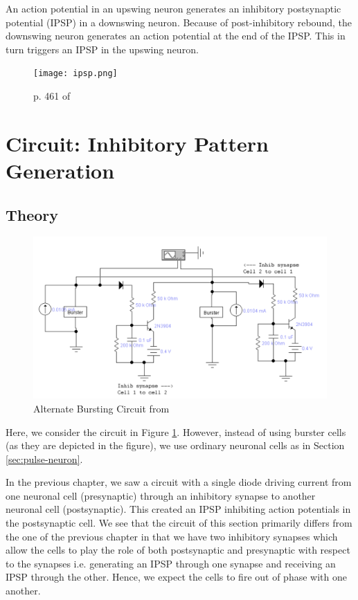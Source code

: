 \documentclass[12]{book}
\newcommand\0{\mathbf{0}}
\newcommand\<{\langle}
\renewcommand\>{\rangle}
\begin{document}
An action potential in an upswing neuron generates an inhibitory postsynaptic potential (IPSP) in a downswing neuron. Because of post-inhibitory rebound, the downswing neuron generates an action potential at the end of the IPSP. This in turn triggers an IPSP in the upswing neuron.


\begin{figure}[H]
\centering
\texttt{[image: ipsp.png]}	
\caption{p. 461 of \cite{levitan2015neuron}}
\end{figure}

\section{Circuit: Inhibitory Pattern Generation}

\subsection{Theory}

\begin{figure}[H]
\label{fig:pattern}
\centering
\includegraphics[width=\textwidth]{pattern_circuit}	
\caption{Alternate Bursting Circuit from \cite{maeda2000pulse}}
\end{figure}

Here, we consider the circuit in Figure \ref{fig:pattern}. However, instead of using burster cells (as they are depicted in the figure), we use ordinary neuronal cells as in Section \ref{sec:pulse-neuron}.

In the previous chapter, we saw a circuit with a single diode driving current from one neuronal cell (presynaptic) through an inhibitory synapse to another neuronal cell (postsynaptic). This created an IPSP inhibiting action potentials in the postsynaptic cell. We see that the circuit of this section primarily differs from the one of the previous chapter in that we have two inhibitory synapses which allow the cells to play the role of both postsynaptic and presynaptic with respect to the synapses i.e. generating an IPSP through one synapse and receiving an IPSP through the other. Hence, we expect the cells to fire out of phase with one another.
\end{document}
